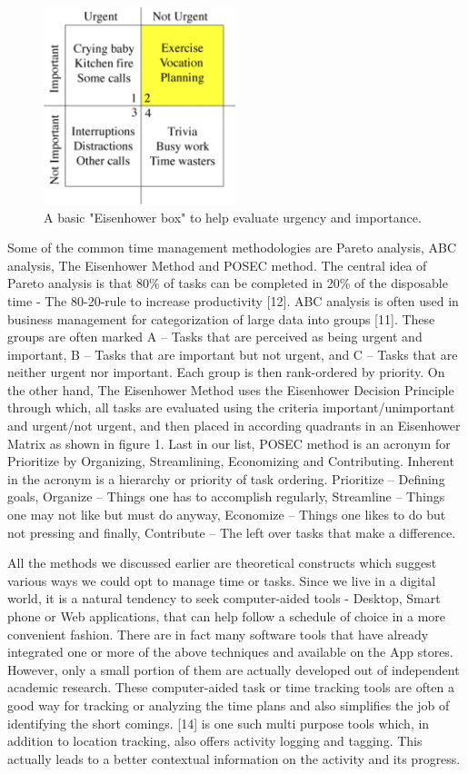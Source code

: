 \documentclass[conference]{IEEEtran}
\begin{document}
\begin{figure}[hb]
  \centering
  \includegraphics[width=2.2in]{eisenhower}
  \caption[]
   {A basic "Eisenhower box" to help evaluate urgency and importance.}
\end{figure}

Some of the common time management methodologies are Pareto analysis, ABC analysis, The Eisenhower Method and POSEC method. The central idea of Pareto analysis is that 80\% of tasks can be completed in 20\% of the disposable time - The 80-20-rule to increase productivity [12]. ABC analysis is often used in business management for categorization of large data into groups [11]. These groups are often marked A -- Tasks that are perceived as being urgent and important, B -- Tasks that are important but not urgent, and C -- Tasks that are neither urgent nor important. Each group is then rank-ordered by priority. On the other hand, The Eisenhower Method uses the Eisenhower Decision Principle through which, all tasks are evaluated using the criteria important/unimportant and urgent/not urgent, and then placed in according quadrants in an Eisenhower Matrix as shown in figure 1. Last in our list, POSEC method is an acronym for Prioritize by Organizing, Streamlining, Economizing and Contributing. Inherent in the acronym is a hierarchy or priority of task ordering. Prioritize -- Defining goals, Organize -- Things one has to accomplish regularly, Streamline -- Things one may not like but must do anyway, Economize -- Things one likes to do but not pressing and finally, Contribute -- The left over tasks that make a difference. 

All the methods we discussed earlier are theoretical constructs which suggest various ways we could opt to manage time or tasks. Since we live in a digital world, it is a natural tendency to seek computer-aided tools - Desktop, Smart phone or Web applications, that can help follow a schedule of choice in a more convenient fashion. There are in fact many software tools that have already integrated one or more of the above techniques and available on the App stores. However, only a small portion of them are actually developed out of independent academic research. These computer-aided task or time tracking tools are often a good way for tracking or analyzing the time plans and also simplifies the job of identifying the short comings. [14] is one such multi purpose tools which, in addition to location tracking, also offers activity logging and tagging. This actually leads to a better contextual information on the activity and its progress.
\end{document}
